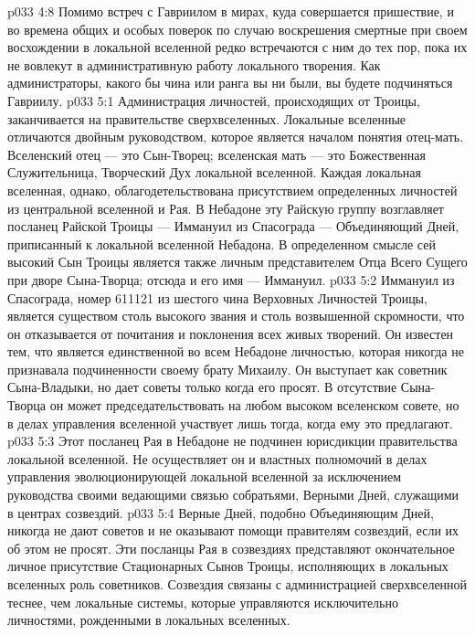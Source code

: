 \vs p033 4:8 Помимо встреч с Гавриилом в мирах, куда совершается пришествие, и во времена общих и особых поверок по случаю воскрешения смертные при своем восхождении в локальной вселенной редко встречаются с ним до тех пор, пока их не вовлекут в административную работу локального творения. Как администраторы, какого бы чина или ранга вы ни были, вы будете подчиняться Гавриилу.
\vs p033 5:1 Администрация личностей, происходящих от Троицы, заканчивается на правительстве сверхвселенных. Локальные вселенные отличаются двойным руководством, которое является началом понятия отец\hyp{}мать. Вселенский отец --- это Сын\hyp{}Творец; вселенская мать --- это Божественная Служительница, Творческий Дух локальной вселенной. Каждая локальная вселенная, однако, облагодетельствована присутствием определенных личностей из центральной вселенной и Рая. В Небадоне эту Райскую группу возглавляет посланец Райской Троицы --- Иммануил из Спасограда --- Объединяющий Дней, приписанный к локальной вселенной Небадона. В определенном смысле сей высокий Сын Троицы является также личным представителем Отца Всего Сущего при дворе Сына\hyp{}Творца; отсюда и его имя --- Иммануил.
\vs p033 5:2 Иммануил из Спасограда, номер 611121 из шестого чина Верховных Личностей Троицы, является существом столь высокого звания и столь возвышенной скромности, что он отказывается от почитания и поклонения всех живых творений. Он известен тем, что является единственной во всем Небадоне личностью, которая никогда не признавала подчиненности своему брату Михаилу. Он выступает как советник Сына\hyp{}Владыки, но дает советы только когда его просят. В отсутствие Сына\hyp{}Творца он может председательствовать на любом высоком вселенском совете, но в делах управления вселенной участвует лишь тогда, когда ему это предлагают.
\vs p033 5:3 Этот посланец Рая в Небадоне не подчинен юрисдикции правительства локальной вселенной. Не осуществляет он и властных полномочий в делах управления эволюционирующей локальной вселенной за исключением руководства своими ведающими связью собратьями, Верными Дней, служащими в центрах созвездий.
\vs p033 5:4 Верные Дней, подобно Объединяющим Дней, никогда не дают советов и не оказывают помощи правителям созвездий, если их об этом не просят. Эти посланцы Рая в созвездиях представляют окончательное личное присутствие Стационарных Сынов Троицы, исполняющих в локальных вселенных роль советников. Созвездия связаны с администрацией сверхвселенной теснее, чем локальные системы, которые управляются исключительно личностями, рожденными в локальных вселенных.
